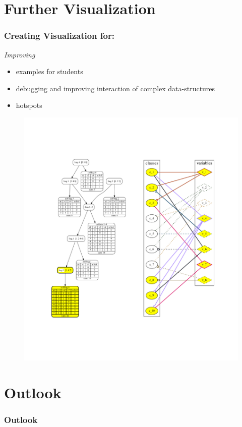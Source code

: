 \documentclass[c,8pt,xcolor...,x11names]{beamer}
\begin{document}
\section{Further Visualization}
\begin{frame}
	\frametitle{Creating Visualization for:}
	\begin{minipage}{0.44\textwidth}
		\emph{Improving}
		\begin{itemize}
			\item examples for students
			\item debugging and improving interaction of complex data-structures
			\item hotspots
		\end{itemize}\medskip

	\end{minipage}
	\begin{minipage}{0.55\textwidth}
		\begin{figure}
			\includegraphics[width=\linewidth]{images/combined8.png}
		\end{figure}
	\end{minipage}

\end{frame}

\section{Outlook}
\begin{frame}
	\frametitle{Outlook}
	\medskip

\end{frame}


\bgroup
{}
\begin{frame}[plain]{}
\end{frame}
\egroup
\end{document}
